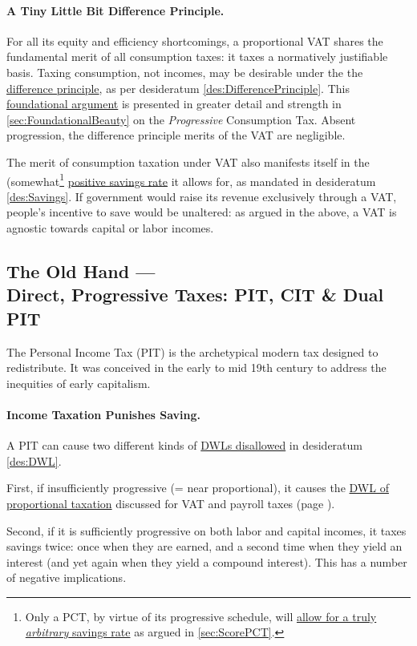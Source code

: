 \paragraph{A Tiny Little Bit Difference Principle.} For all its equity and efficiency shortcomings, a proportional VAT shares the fundamental merit of all consumption taxes: it taxes a normatively justifiable basis. Taxing consumption, not incomes, may be desirable under the the \hyperref[des:DifferencePrinciple]{difference principle}, as per desideratum \ref{des:DifferencePrinciple}. This \hyperref[sec:FoundationalBeauty]{foundational argument} is presented in greater detail and strength in \ref{sec:FoundationalBeauty} on the \emph{Progressive} Consumption Tax. Absent progression, the difference principle merits of the VAT are negligible.

The merit of consumption taxation under VAT also manifests itself in the (somewhat\footnote{
	Only a PCT, by virtue of its progressive schedule, will \hyperref[sec:ScorePCT]{allow for a truly \emph{arbitrary} savings rate} as argued in \autoref{sec:ScorePCT}.}
\hyperref[des:Savings]{positive savings rate} it allows for, as mandated in desideratum \ref{des:Savings}. If government would raise its revenue exclusively through a VAT, people's incentive to save would be unaltered: as argued in the above, a VAT is agnostic towards capital or labor incomes. 

\subsection[Direct, Progressive Taxes]{The Old Hand ---\\Direct, Progressive Taxes: PIT, CIT \& Dual PIT} \label{sec:ScorePIT} The Personal Income Tax (PIT) is the archetypical modern tax designed to redistribute. It was conceived in the early to mid 19th century to address the inequities of early capitalism. 

\paragraph{Income Taxation Punishes Saving.} A PIT can cause two different kinds of \hyperref[des:DWL]{DWLs disallowed} in desideratum \ref{des:DWL}. 

First, if insufficiently progressive (= near proportional), it causes the \hyperref[sec:PropTaxDWL]{DWL of proportional taxation} discussed for VAT and payroll taxes (page \pageref{sec:PropTaxDWL}).

Second, if it is sufficiently progressive on both labor and capital incomes, it taxes savings twice: once when they are earned, and a second time when they yield an interest (and yet again when they yield a compound interest). This has a number of negative implications.

